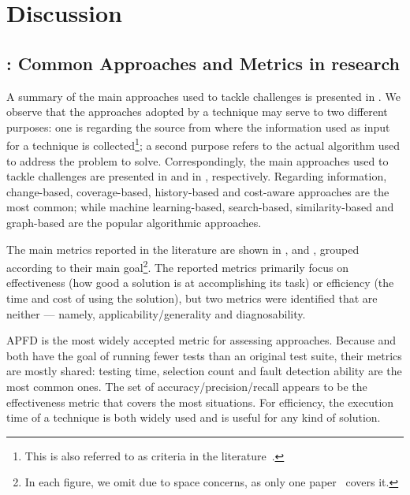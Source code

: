 \section{Discussion}\label{sec:lit_discussion}

\subsection{: Common Approaches and Metrics in \rt research}
\label{sec:lit_rq1}

A summary of the main approaches used to tackle \rt challenges is presented in .
We observe that the approaches adopted by a technique may serve to two different purposes:
one is regarding the source from where the information used as input for a technique is collected\footnote{This is also referred to as criteria in the literature~\citep{lou_survey_2018}.}; a second purpose refers to the actual algorithm used to address the problem to solve.
Correspondingly, the main approaches used to tackle \rt challenges are presented in  and in , respectively.
Regarding information, change-based, coverage-based, history-based and cost-aware approaches are the most common; while machine learning-based, search-based, similarity-based and graph-based are the popular algorithmic approaches.



The main metrics reported in the literature are shown in ,  and , grouped according to their main goal\footnote{In each figure, we omit \tsa due to space concerns, as only one paper~ covers it.}.
The reported metrics primarily focus on effectiveness (how good a solution is at accomplishing its task) or efficiency (the time and cost of using the solution), but two metrics were identified that are neither --- namely, applicability/generality and diagnosability.

APFD is the most widely accepted metric for assessing \tcp{} approaches.
Because \tcs and \tsr both have the goal of running fewer tests than an original test suite, their metrics are mostly shared: testing time, selection count and fault detection ability are the most common ones.
The set of accuracy/precision/recall appears to be the effectiveness metric that covers the most situations.
For efficiency, the execution time of a technique is both widely used and is useful for any kind of solution.

